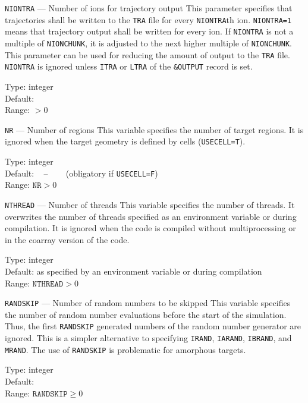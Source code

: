 \begin{keydescription}{\texttt{NIONTRA} --- Number of ions for trajectory output}
	This parameter specifies that trajectories shall be written to the 
	\texttt{TRA} file for every \texttt{NIONTRA}th ion. 
	\texttt{NIONTRA=1} means that trajectory output shall be written for every 
	ion.  
	If \texttt{NIONTRA} is not a multiple of \texttt{NIONCHUNK}, it is 
	adjusted to the next higher multiple of \texttt{NIONCHUNK}. 
    This parameter can be used for reducing the amount of output to the 
	\texttt{TRA} file. 
    \texttt{NIONTRA} is ignored unless \texttt{ITRA}
	or \texttt{LTRA} of the \texttt{\&OUTPUT} record is set.
	\begin{keytab}
		Type:    \> integer \\
		Default:   \\
		Range:   \> $> 0$
	\end{keytab}
\end{keydescription}

\begin{keydescription}{\texttt{NR} --- Number of regions}
%
  This variable specifies the number of target regions. It is ignored when
  the target geometry is defined by cells (\texttt{USECELL=T}).
%
  \begin{keytab}
    Type:    \> integer \\
    Default: \> ~ -- ~~~ (obligatory if \texttt{USECELL=F}) \\
    Range:   \> $\texttt{NR} > 0$
  \end{keytab}
\end{keydescription}

\begin{keydescription}{\texttt{NTHREAD} --- Number of threads}
%
  This variable specifies the number of threads. It overwrites the number of
  threads specified as an environment variable or during compilation. It
  is ignored when the code is compiled without multiprocessing or in the
  coarray version of the code. 
%
  \begin{keytab}
    Type:    \> integer \\
    Default: \> as specified by an environment variable or during compilation \\
    Range:   \> $\texttt{NTHREAD} > 0$
  \end{keytab}
\end{keydescription}

\begin{keydescription}{\texttt{RANDSKIP} --- Number of random numbers to be skipped}
%
  This variable specifies the number of random number evaluations before the start 
  of the simulation. Thus, the first \texttt{RANDSKIP} generated numbers of the 
  random number generator are ignored. This is a simpler alternative to specifying
  \texttt{IRAND}, \texttt{IARAND}, \texttt{IBRAND}, and \texttt{MRAND}. The use of 
  \texttt{RANDSKIP} is problematic for amorphous targets.
%
  \begin{keytab}
    Type:    \> integer \\
    Default:  \\
    Range:   \> $\texttt{RANDSKIP} \ge 0$
  \end{keytab}
\end{keydescription}

